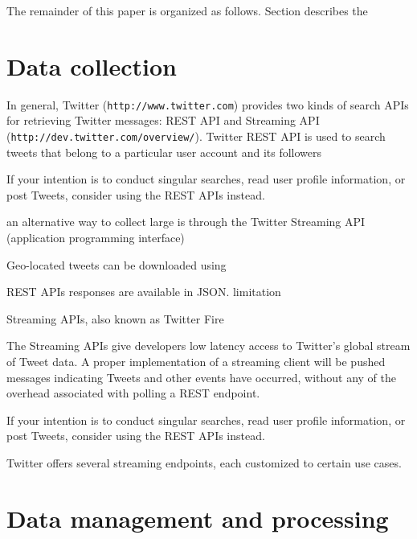 \documentclass[a4paper,11pt]{article}
\begin{document}
The remainder of this paper is organized as follows. Section describes the 

\section*{Data collection}
In general, Twitter ({\tt{http://www.twitter.com}}) provides two kinds of search APIs for retrieving Twitter messages:  REST API and Streaming API ({\tt{http://dev.twitter.com/overview/}}). 
Twitter REST API is used to search tweets that belong to a particular user account and its followers  

If your intention is to conduct singular searches, read user profile information, or post Tweets, consider using the REST APIs instead.

an alternative way to collect large is through the Twitter Streaming API (application programming interface)

Geo-located tweets can be downloaded using 

REST APIs responses are available in JSON.
limitation


Streaming APIs, also known as Twitter Fire 

The Streaming APIs give developers low latency access to Twitter’s global stream of Tweet data. 
A proper implementation of a streaming client will be pushed messages indicating Tweets and other events have occurred, without any of the overhead associated with polling a REST endpoint.


If your intention is to conduct singular searches, read user profile information, or post Tweets, consider using the REST APIs instead.

Twitter offers several streaming endpoints, each customized to certain use cases.


\section*{Data management and processing}
\end{document}
